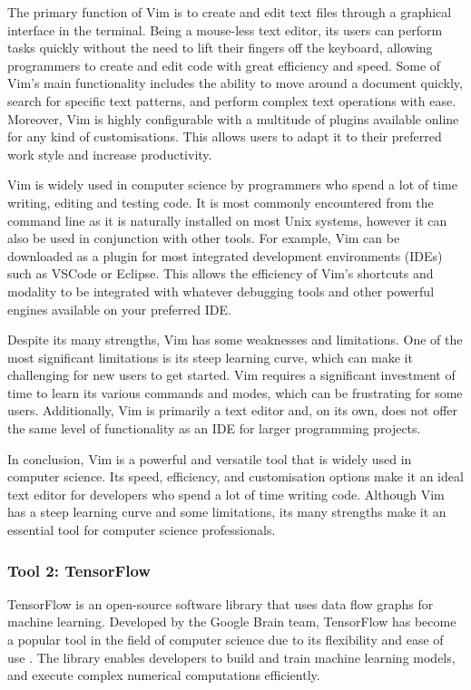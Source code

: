 \documentclass[a4paper, 11pt]{report}
\begin{document}
The primary function of Vim is to create and edit text files through a graphical interface in the terminal. Being a mouse-less text editor, its users can perform tasks quickly without the need to lift their fingers off the keyboard, allowing programmers to create and edit code with great efficiency and speed. Some of Vim's main functionality includes the ability to move around a document quickly, search for specific text patterns, and perform complex text operations with ease. Moreover, Vim is highly configurable with a multitude of plugins available online for any kind of customisations. This allows users to adapt it to their preferred work style and increase productivity.

Vim is widely used in computer science by programmers who spend a lot of time writing, editing and testing code. It is most commonly encountered from the command line as it is naturally installed on most Unix systems, however it can also be used in conjunction with other tools. For example, Vim can be downloaded as a plugin for most integrated development environments (IDEs) such as VSCode or Eclipse. This allows the efficiency of Vim’s shortcuts and modality to be integrated with whatever debugging tools and other powerful engines available on your preferred IDE.

Despite its many strengths, Vim has some weaknesses and limitations. One of the most significant limitations is its steep learning curve, which can make it challenging for new users to get started. Vim requires a significant investment of time to learn its various commands and modes, which can be frustrating for some users. Additionally, Vim is primarily a text editor and, on its own, does not offer the same level of functionality as an IDE for larger programming projects.

In conclusion, Vim is a powerful and versatile tool that is widely used in computer science. Its speed, efficiency, and customisation options make it an ideal text editor for developers who spend a lot of time writing code. Although Vim has a steep learning curve and some limitations, its many strengths make it an essential tool for computer science professionals.

\subsubsection{Tool 2: TensorFlow}

TensorFlow is an open-source software library that uses data flow graphs for machine learning. Developed by the Google Brain team, TensorFlow has become a popular tool in the field of computer science due to its flexibility and ease of use \cite{nvidia}. The library enables developers to build and train machine learning models, and execute complex numerical computations efficiently.
\end{document}
